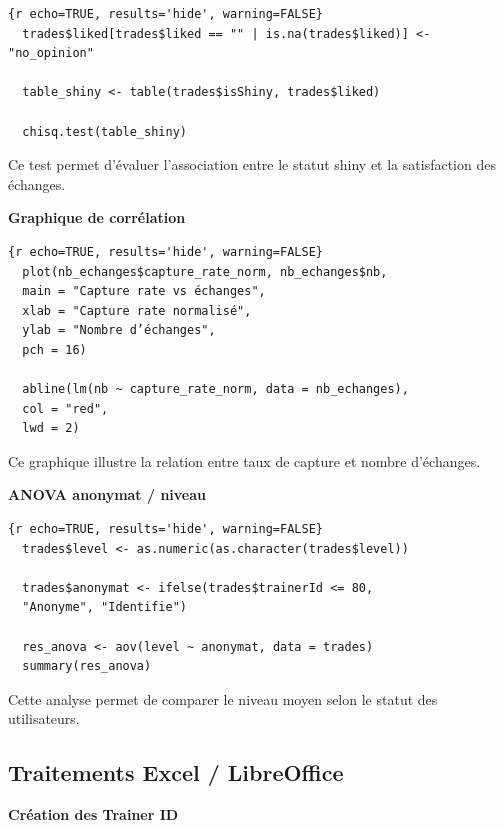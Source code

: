 \documentclass[mstat,12pt]{unswthesis}
\begin{document}
\begin{verbatim}
{r echo=TRUE, results='hide', warning=FALSE}
  trades$liked[trades$liked == "" | is.na(trades$liked)] <- "no_opinion"
  
  table_shiny <- table(trades$isShiny, trades$liked)
  
  chisq.test(table_shiny)
\end{verbatim}

\smallskip

Ce test permet d'évaluer l'association entre le statut shiny et la
satisfaction des échanges.

\bigskip
\bigskip

\textbf{Graphique de corrélation}

\begin{verbatim}
{r echo=TRUE, results='hide', warning=FALSE}
  plot(nb_echanges$capture_rate_norm, nb_echanges$nb,
  main = "Capture rate vs échanges",
  xlab = "Capture rate normalisé",
  ylab = "Nombre d’échanges",
  pch = 16)
  
  abline(lm(nb ~ capture_rate_norm, data = nb_echanges),
  col = "red",
  lwd = 2)
\end{verbatim}

\smallskip

Ce graphique illustre la relation entre taux de capture et nombre
d'échanges.

\bigskip
\bigskip

\textbf{ANOVA anonymat / niveau}

\begin{verbatim}
{r echo=TRUE, results='hide', warning=FALSE}
  trades$level <- as.numeric(as.character(trades$level))
  
  trades$anonymat <- ifelse(trades$trainerId <= 80,
  "Anonyme", "Identifie")
  
  res_anova <- aov(level ~ anonymat, data = trades)
  summary(res_anova)
\end{verbatim}

\smallskip

Cette analyse permet de comparer le niveau moyen selon le statut des
utilisateurs.

\bigskip
\bigskip

\subsection{Traitements Excel /
LibreOffice}\label{traitements-excel-libreoffice}

\textbf{Création des Trainer ID}
\end{document}
